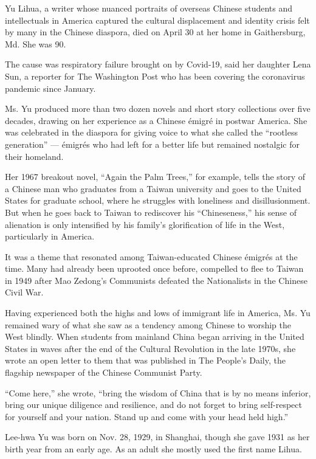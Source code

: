 Yu Lihua, a writer whose nuanced portraits of overseas Chinese students
and intellectuals in America captured the cultural displacement and
identity crisis felt by many in the Chinese diaspora, died on April 30
at her home in Gaithersburg, Md. She was 90.

The cause was respiratory failure brought on by Covid-19, said her
daughter Lena Sun, a reporter for The Washington Post who has been
covering the coronavirus pandemic since January.

Ms. Yu produced more than two dozen novels and short story collections
over five decades, drawing on her experience as a Chinese émigré in
postwar America. She was celebrated in the diaspora for giving voice to
what she called the ``rootless generation'' --- émigrés who had left for
a better life but remained nostalgic for their homeland.

Her 1967 breakout novel, ``Again the Palm Trees,'' for example, tells
the story of a Chinese man who graduates from a Taiwan university and
goes to the United States for graduate school, where he struggles with
loneliness and disillusionment. But when he goes back to Taiwan to
rediscover his ``Chineseness,'' his sense of alienation is only
intensified by his family's glorification of life in the West,
particularly in America.

It was a theme that resonated among Taiwan-educated Chinese émigrés at
the time. Many had already been uprooted once before, compelled to flee
to Taiwan in 1949 after Mao Zedong's Communists defeated the
Nationalists in the Chinese Civil War.

Having experienced both the highs and lows of immigrant life in America,
Ms. Yu remained wary of what she saw as a tendency among Chinese to
worship the West blindly. When students from mainland China began
arriving in the United States in waves after the end of the Cultural
Revolution in the late 1970s, she wrote an open letter to them that was
published in The People's Daily, the flagship newspaper of the Chinese
Communist Party.

``Come here,'' she wrote, ``bring the wisdom of China that is by no
means inferior, bring our unique diligence and resilience, and do not
forget to bring self-respect for yourself and your nation. Stand up and
come with your head held high.''

Lee-hwa Yu was born on Nov. 28, 1929, in Shanghai, though she gave 1931
as her birth year from an early age. As an adult she mostly used the
first name Lihua.

